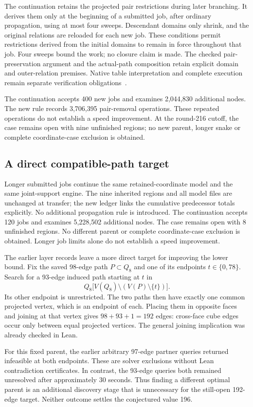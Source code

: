 \documentclass[11pt,a4paper]{article}
\theoremstyle{definition}
\theoremstyle{remark}
\begin{document}
The continuation retains the projected pair restrictions during later
branching. It derives them only at the beginning of a submitted job,
after ordinary propagation, using at most four sweeps. Descendant
domains only shrink, and the original relations are reloaded for each
new job. These conditions permit restrictions derived from the initial
domains to remain in force throughout that job. Four sweeps bound the
work; no closure claim is made. The checked pair-preservation argument
and the actual-path composition retain explicit domain and outer-relation
premises. Native table interpretation and complete execution remain
separate verification obligations~\cite{research216}.

The continuation accepts 400 new jobs and examines 2,044,830 additional nodes. The new rule records 3,706,395 pair-removal operations. These repeated operations do not establish a speed improvement. At the round-216 cutoff, the case remains open with nine unfinished regions; no new parent, longer snake or complete coordinate-case exclusion is obtained.


\subsection{A direct compatible-path target}
\label{sec:direct217}
Longer submitted jobs continue the same retained-coordinate model and
the same joint-support engine. The nine inherited regions and all model
files are unchanged at transfer; the new ledger links the cumulative
predecessor totals explicitly. No additional propagation rule is introduced.
The continuation accepts 120 jobs and examines 5,228,502 additional nodes. The case remains open with 8 unfinished regions. No different parent or complete coordinate-case exclusion is obtained. Longer job limits alone do not establish a speed improvement.


The earlier layer records leave a more direct target for improving the
lower bound. Fix the saved 98-edge path $P\subset Q_8$ and one of its
endpoints $t\in\{0,78\}$. Search for a 93-edge induced path starting at
$t$ in
\[
Q_8\bigl[V(Q_8)\setminus(V(P)\setminus\{t\})\bigr].
\]
Its other endpoint is unrestricted. The two paths then have exactly one
common projected vertex, which is an endpoint of each. Placing them in
opposite faces and joining at that vertex gives $98+93+1=192$ edges:
cross-face cube edges occur only between equal projected vertices.
The general joining implication was already checked in Lean.

For this fixed parent, the earlier arbitrary 97-edge partner queries
returned infeasible at both endpoints. These are solver exclusions
without Lean contradiction certificates. In contrast, the 93-edge
queries both remained unresolved after approximately 30 seconds.
Thus finding a different optimal parent is an additional discovery
stage that is unnecessary for the still-open 192-edge target.
Neither outcome settles the conjectured value 196.
\end{document}

